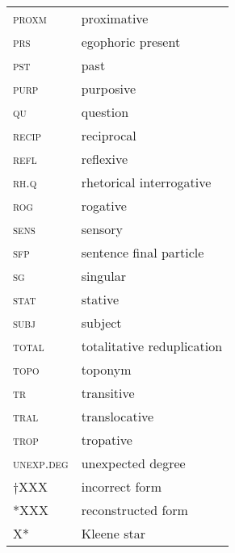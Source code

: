 \begin{multicols}{2}
\begin{tabular}{lp{4.5cm}} 
\textsc{proxm} 	&	proximative	\\
\textsc{prs} 	&	egophoric present	\\
\textsc{pst} 	&	past	\\
\textsc{purp} 	&	purposive	\\
\textsc{qu} 	&	question	\\
\textsc{recip} 	&	reciprocal	\\
\textsc{refl} 	&	reflexive	\\
\textsc{rh.q} 	&	rhetorical interrogative	\\
\textsc{rog} 	&	rogative	\\
\textsc{sens} 	&	sensory	\\
\textsc{sfp} 	&	sentence final particle	\\
\textsc{sg} 	&	singular	\\
\textsc{stat} 	&	stative	\\
\textsc{subj} 	&	subject	\\
\textsc{total} 	&	totalitative reduplication	\\
\textsc{topo} 	&	toponym	\\
\textsc{tr} 	&	transitive	\\
\textsc{tral} 	&	translocative	\\
\textsc{trop} 	&	tropative	\\
\textsc{unexp.deg} 	&	unexpected degree	\\
$\dagger$XXX	&	incorrect form	\\
*XXX	&	reconstructed form	\\
X*	&	Kleene star	\\
\end{tabular}
\end{multicols} 